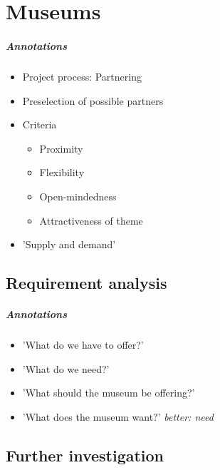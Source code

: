 \chapter{Museums}
\label{museums}

\paragraph{Annotations}

\begin{itemize}
	\item Project process: Partnering
	\\
	\item Preselection of possible partners
	\item Criteria
	\begin{itemize}
		\item Proximity
		\item Flexibility
		\item Open-mindedness
		\item Attractiveness of theme
	\end{itemize}
	\item 'Supply and demand'
\end{itemize}



\section{Requirement analysis}
\label{museums_requirement}

\paragraph{Annotations}

\begin{itemize}
	\item 'What do we have to offer?'
	\item 'What do we need?'
	\item 'What should the museum be offering?'
	\item 'What does the museum want?' \textit{better: need}
\end{itemize}



\section{Further investigation}
\label{museums_investigation}

